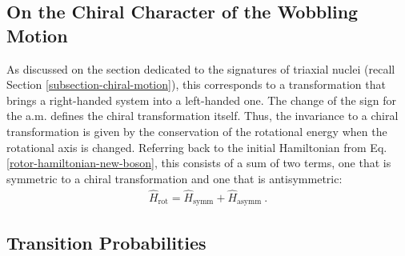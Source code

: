 \subsection{On the Chiral Character of the Wobbling Motion}

As discussed on the section dedicated to the signatures of triaxial nuclei (recall Section \ref{subsection-chiral-motion}), this corresponds to a transformation that brings a right-handed system into a left-handed one. The change of the sign for the a.m. defines the chiral transformation itself. Thus, the invariance to a chiral transformation is given by the conservation of the rotational energy when the rotational axis is changed. Referring back to the initial Hamiltonian from Eq. \ref{rotor-hamiltonian-new-boson}, this consists of a sum of two terms, one that is symmetric to a chiral transformation and one that is antisymmetric:
\begin{align}
    \hat{H}_\text{rot}=\hat{H}_\text{symm}+\hat{H}_\text{asymm}\ .
\end{align}

\subsection{Transition Probabilities}